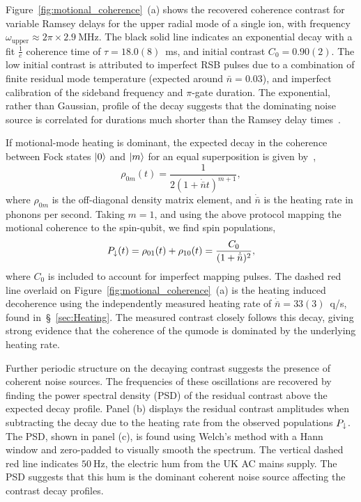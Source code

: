     Figure~\ref{fig:motional_coherence}~(a) shows the recovered coherence contrast
    for variable Ramsey delays for the upper radial mode of a single ion, with
    frequency $\omega_\mathrm{upper}\approx 2\pi\times2.9~\unit{\mega\hertz}$.
    The black solid line indicates an exponential decay with a fit $\frac{1}{e}$ coherence time
    of $\tau = 18.0(8)$~\unit{\ms}, and initial contrast $C_0 = 0.90(2)$. The
    low initial contrast is attributed to imperfect RSB pulses due to a
    combination of finite residual mode temperature (expected around
    $\bar{n}=0.03$), and imperfect calibration of the sideband frequency and
    $\pi$-gate duration.
    The exponential, rather than Gaussian, profile of the decay suggests that the dominating noise
    source is correlated for durations much shorter
    than the Ramsey delay times~\cite{omalley_qubit_2015}. 

    If motional-mode heating is dominant, the expected decay in the coherence 
    between Fock states $\ket{0}$ and $\ket{m}$ for an equal superposition is given by~\cite{turchette_decoherence_2000, kienzler_quantum_2015},
    \begin{equation}
        \rho_{0m}(t)=\frac{1}{2(1+\dot{\bar{n}}t)^{m+1}},
    \end{equation}
    where $\rho_{0m}$ is the off-diagonal density matrix element, and 
    $\dot{\bar{n}}$ is the heating rate in phonons per second.
    Taking $m=1$, and using the above protocol mapping the motional coherence to the spin-qubit, we find spin populations,
    \begin{equation}
    P_\downarrow(t) = \rho_{01}(t) + \rho_{10}(t) = \frac{C_0}{(1+\dot{\bar{n}})^2},
    \end{equation}
    where $C_0$ is included to account for imperfect mapping pulses. 
    The dashed red line overlaid on Figure~\ref{fig:motional_coherence}~(a) is the
    heating induced decoherence using the independently measured heating rate of
    $\dot{\bar{n}}=33(3)$~q/s, found in~\S~\ref{sec:Heating}. The measured
    contrast closely follows this decay, giving strong evidence that the
    coherence of the qumode is dominated by the underlying heating rate.

    Further periodic structure on the decaying contrast suggests the
    presence of coherent noise sources. The frequencies of these oscillations
    are recovered by finding the power spectral density (PSD) of the residual
    contrast above the expected decay profile. Panel (b) displays the residual contrast amplitudes when
    subtracting the decay due to the heating rate from the observed populations $P_\downarrow$. The
    PSD, shown in panel (c), is found using Welch's method with a Hann window and zero-padded to
    visually smooth the spectrum. The vertical dashed red line indicates
    $50~\unit{\hertz}$, the electric hum from the UK AC mains supply. The PSD
    suggests that this hum is the dominant coherent noise source affecting the
    contrast decay profiles.\\

